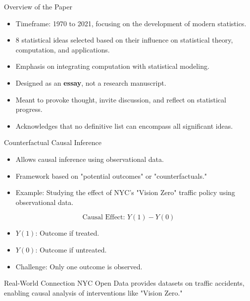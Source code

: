 \documentclass{beamer}
\begin{document}
\begin{frame}{Overview of the Paper}
\begin{itemize}
    \item Timeframe: 1970 to 2021, focusing on the development of modern statistics.
    \item 8 statistical ideas selected based on their influence on statistical theory, computation, and applications.
    \item Emphasis on integrating computation with statistical modeling.
    \item Designed as an \textbf{essay}, not a research manuscript.
            \item Meant to provoke thought, invite discussion, and reflect on statistical progress.
            \item Acknowledges that no definitive list can encompass all significant ideas.
\end{itemize}
\end{frame}

\begin{frame}{Counterfactual Causal Inference}
\begin{itemize}
    \item Allows causal inference using observational data.
    \item Framework based on "potential outcomes" or "counterfactuals."
    \item Example: Studying the effect of NYC’s "Vision Zero" traffic policy using observational data.
\end{itemize}

\[
\text{Causal Effect: } Y(1) - Y(0)
\]
\begin{itemize}
    \item \( Y(1) \): Outcome if treated.
    \item \( Y(0) \): Outcome if untreated.
    \item Challenge: Only one outcome is observed.
\end{itemize}

\begin{block}{Real-World Connection}
NYC Open Data provides datasets on traffic accidents, enabling causal analysis of interventions like "Vision Zero."
\end{block}
\end{frame}
\end{document}
